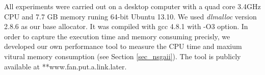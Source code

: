 All experiments were carried out on a desktop computer with a quad core 3.4GHz CPU and 7.7 GB memory runing 64-bit Ubuntu 13.10. We used \emph{dlmalloc} version 2.8.6 as our base allocator. It was compiled with gcc 4.8.1 with -O3 option. In order to capture the execution time and memory consuming precisly, we developed our own performance tool to measure the CPU time and maxium vitural memory consumption (see Section \ref{sec_nsgaii}). The tool is publicly available at **www.fan.put.a.link.later.

